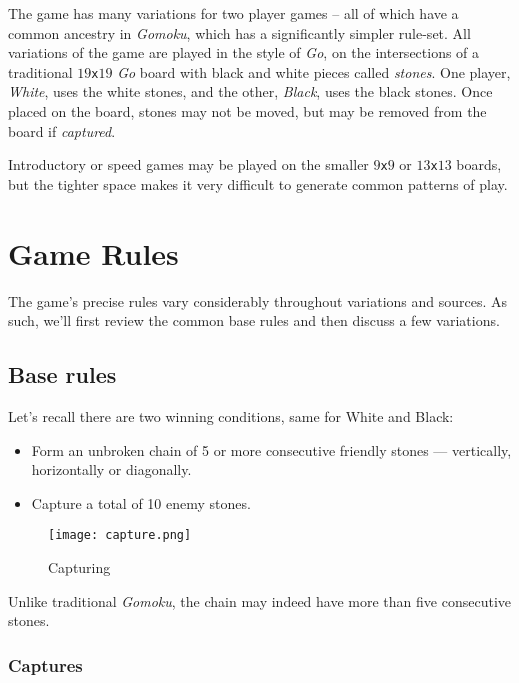 \documentclass[12pt,a4paper,notitlepage]{article}
\newcommand*{\boardsize}[1]{$#1$\texttt{x}$#1$}
\begin{document}
The game has many variations for two player games -- all of which have a common ancestry in \textit{Gomoku}, which has a significantly simpler rule-set.
All variations of the game are played in the style of \textit{Go}, on the intersections of a traditional \boardsize{19} \emph{Go} board with black and white pieces called \emph{stones}. One player, \textsl{White}, uses the white stones, and the other, \textsl{Black}, uses the black stones. Once placed on the board, stones may not be moved, but may be removed from the board if \emph{captured}.

Introductory or speed games may be played on the smaller \boardsize{9} or \boardsize{13} boards, but the tighter space makes it very difficult to generate common patterns of play.

\section{Game Rules}
\label{sec:rules}

The game's precise rules vary considerably throughout variations and sources. As such, we'll first review the common base rules and then discuss a few variations.

\subsection{Base rules}
\label{subsec:baserules}

Let's recall there are two winning conditions, same for White and Black:

\begin{itemize}
	\large
	\item Form an unbroken chain of 5 or more consecutive friendly stones --- vertically, horizontally or diagonally.
	\item Capture a total of 10 enemy stones.
\end{itemize}

\begin{wrapfigure}[8]{r}[2em]{0.3\textwidth}
	\vspace*{-3\baselineskip}
	\texttt{[image: capture.png]}
	\caption{Capturing\supercite{pente-net} \label{fig:capture}}
\end{wrapfigure}

Unlike traditional \textit{Gomoku}, the chain may indeed have more than five consecutive stones.

\subsubsection{Captures}
\label{subsubsec:captures}
\end{document}
